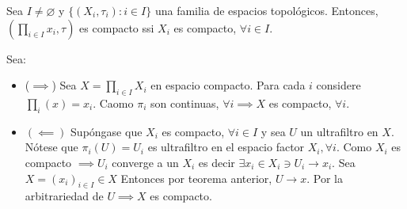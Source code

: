 \begin{teorema}[Tikonov]
    Sea $I\neq\varnothing$ y $\{(X_i,\tau_i):i\in I\}$ una familia de espacios topológicos. Entonces, $(\prod_{i\in I}x_i,\tau)$ es compacto ssi $X_i$ es compacto, $\forall i\in I$. 
    \begin{dem}
        Sea: 

        \begin{itemize}
            \item ($\implies$) Sea $X=\prod_{i\in I} X_i$ en espacio compacto. Para cada $i$ considere $\prod_i(x)=x_i$. Caomo $\pi_i$ son continuas, $\forall i\implies X$ es compacto, $\forall i$. 
            \item $(\impliedby)$ Supóngase que $X_i$ es compacto, $\forall i\in I$ y sea $U$ un ultrafiltro en $X$. Nótese que $\pi_i(U)=U_i$ es ultrafiltro en el espacio factor $X_i,\forall i$. Como $X_i$ es compacto $\implies  U_i$ converge a un $X_i$ es decir $\exists x_i\in X_i\ni U_i\to x_i$. Sea $X=(x_i)_{i\in I}\in X$ Entonces por teorema anterior, $U\to x$. Por la arbitrariedad de $U\implies X$ es compacto. 
        \end{itemize}
        
    \end{dem} 
\end{teorema}
